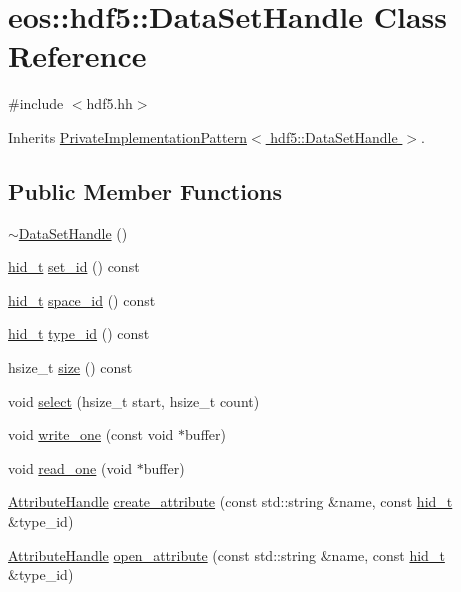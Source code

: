 \hypertarget{classeos_1_1hdf5_1_1DataSetHandle}{
\section{eos::hdf5::DataSetHandle Class Reference}
\label{classeos_1_1hdf5_1_1DataSetHandle}
}


{\ttfamily \#include $<$hdf5.hh$>$}

Inherits \hyperlink{classeos_1_1PrivateImplementationPattern}{PrivateImplementationPattern$<$ hdf5::DataSetHandle $>$}.\subsection*{Public Member Functions}
\begin{DoxyCompactItemize}
\item 
\hyperlink{classeos_1_1hdf5_1_1DataSetHandle_a14a9f5a1e190657f26ca9eb9d6d582cd}{$\sim$DataSetHandle} ()
\item 
\hyperlink{namespaceeos_1_1hdf5_a5bd5e209f1bf36cdc5551465dacf2e74}{hid\_\-t} \hyperlink{classeos_1_1hdf5_1_1DataSetHandle_ac34e42a6ddffcf97b793e0229fdad33e}{set\_\-id} () const 
\item 
\hyperlink{namespaceeos_1_1hdf5_a5bd5e209f1bf36cdc5551465dacf2e74}{hid\_\-t} \hyperlink{classeos_1_1hdf5_1_1DataSetHandle_a394c8a3332ffce21fb2a8f8cda41c985}{space\_\-id} () const 
\item 
\hyperlink{namespaceeos_1_1hdf5_a5bd5e209f1bf36cdc5551465dacf2e74}{hid\_\-t} \hyperlink{classeos_1_1hdf5_1_1DataSetHandle_acd551d06d07b60e6f6f35e5a345fb03e}{type\_\-id} () const 
\item 
hsize\_\-t \hyperlink{classeos_1_1hdf5_1_1DataSetHandle_a713afe404475719f6ac336f70c8bed51}{size} () const 
\item 
void \hyperlink{classeos_1_1hdf5_1_1DataSetHandle_ad41a15bd7f720870427ef14742a2a6cf}{select} (hsize\_\-t start, hsize\_\-t count)
\item 
void \hyperlink{classeos_1_1hdf5_1_1DataSetHandle_a67ea7145dfbcbe860f9e7f745ab9c36c}{write\_\-one} (const void $\ast$buffer)
\item 
void \hyperlink{classeos_1_1hdf5_1_1DataSetHandle_a099c9af4e4d27b956bde64118ef064c9}{read\_\-one} (void $\ast$buffer)
\item 
\hyperlink{classeos_1_1hdf5_1_1AttributeHandle}{AttributeHandle} \hyperlink{classeos_1_1hdf5_1_1DataSetHandle_a084cff6f4549ab930d0d2cff8ff5ac6b}{create\_\-attribute} (const std::string \&name, const \hyperlink{namespaceeos_1_1hdf5_a5bd5e209f1bf36cdc5551465dacf2e74}{hid\_\-t} \&type\_\-id)
\item 
\hyperlink{classeos_1_1hdf5_1_1AttributeHandle}{AttributeHandle} \hyperlink{classeos_1_1hdf5_1_1DataSetHandle_a874dee8bc477055ee76955e78c00a09e}{open\_\-attribute} (const std::string \&name, const \hyperlink{namespaceeos_1_1hdf5_a5bd5e209f1bf36cdc5551465dacf2e74}{hid\_\-t} \&type\_\-id)
\end{DoxyCompactItemize}
